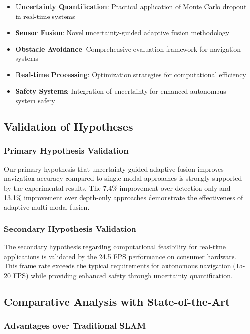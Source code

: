 \documentclass[10pt]{article}
\begin{document}
\begin{itemize}
\item \textbf{Uncertainty Quantification}: Practical application of Monte Carlo dropout in real-time systems
\item \textbf{Sensor Fusion}: Novel uncertainty-guided adaptive fusion methodology
\item \textbf{Obstacle Avoidance}: Comprehensive evaluation framework for navigation systems
\item \textbf{Real-time Processing}: Optimization strategies for computational efficiency
\item \textbf{Safety Systems}: Integration of uncertainty for enhanced autonomous system safety
\end{itemize}

\subsection{Validation of Hypotheses}

\subsubsection{Primary Hypothesis Validation}

Our primary hypothesis that uncertainty-guided adaptive fusion improves navigation accuracy compared to single-modal approaches is strongly supported by the experimental results. The 7.4\% improvement over detection-only and 13.1\% improvement over depth-only approaches demonstrate the effectiveness of adaptive multi-modal fusion.

\subsubsection{Secondary Hypothesis Validation}

The secondary hypothesis regarding computational feasibility for real-time applications is validated by the 24.5 FPS performance on consumer hardware. This frame rate exceeds the typical requirements for autonomous navigation (15-20 FPS) while providing enhanced safety through uncertainty quantification.

\subsection{Comparative Analysis with State-of-the-Art}

\subsubsection{Advantages over Traditional SLAM}
\end{document}
